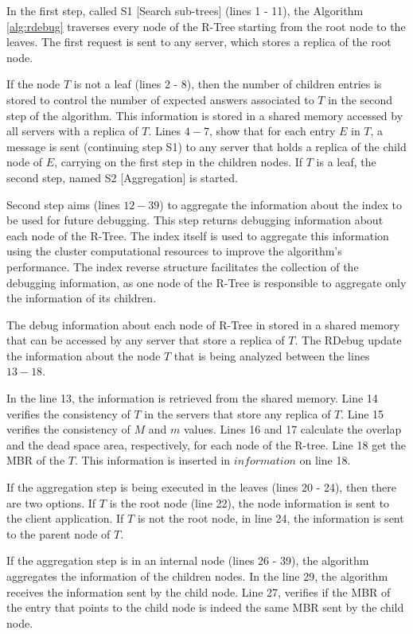 In the first step, called S1 [Search sub-trees] (lines 1 - 11), the Algorithm \ref{alg:rdebug} traverses every node of the R-Tree starting from the root node to the leaves.
The first request is sent to any server, which stores a replica of the root node.

If the node $T$ is not a leaf (lines 2 - 8), then the number of children entries is stored to control the number of expected answers associated to $T$ in the second step of the algorithm. 
This information is stored in a shared memory accessed by all servers with a replica of $T$. Lines $4-7$, show that for each entry $E$ in $T$, 
a message is sent (continuing step S1) to any server that holds a replica of the child node of $E$, carrying on the first step in the children nodes. 
If $T$ is a leaf, the second step, named S2 [Aggregation] is started.

Second step aims (lines $12-39$) to aggregate the information about the index to be used for future debugging.
This step returns debugging information about each node of the R-Tree.
The index itself is used to aggregate this information using the cluster computational resources to improve the algorithm's performance.
The index reverse structure facilitates the collection of the debugging information, 
as one node of the R-Tree is responsible to aggregate only the information of its children. 

The debug information about each node of R-Tree in stored in a shared memory that can be accessed by any server that store a replica of $T$.
The RDebug update the information about the node $T$ that is being analyzed between the lines $13-18$.

In the line 13, the information is retrieved from the shared memory. 
Line 14 verifies the consistency of $T$ in the servers that store any replica of $T$. Line 15 verifies the consistency of $M$ and $m$ values. 
Lines 16 and 17 calculate the overlap and the dead space area, respectively, for each node of the R-tree. 
Line 18 get the MBR of the $T$. This information is inserted in $information$ on line 18.

If the aggregation step is being executed in the leaves (lines 20 - 24), then there are two options.
If $T$ is the root node (line 22), the node information is sent to the client application. 
If $T$ is not the root node, in line 24, the information is sent to the parent node of $T$. 

If the aggregation step is in an internal node (lines 26 - 39), the algorithm aggregates the information of the children nodes. 
In the line 29, the algorithm receives the information sent by the child node. 
Line 27, verifies if the MBR of the entry that points to the child node is indeed the same MBR sent by the child node.
	
